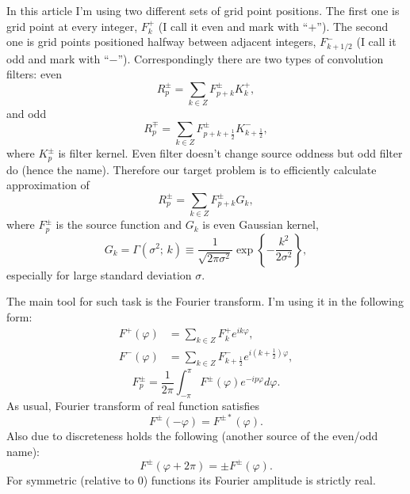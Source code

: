 \documentclass[10pt]{article}
\begin{document}
In this article I'm using two different sets of grid point positions. The first one is grid point at
every integer, $F^+_k$ (I call it even and mark with ``$+$''). The second one is grid points positioned
halfway between adjacent integers, $F^-_{k+1/2}$ (I call it odd and mark with ``$-$'').
Correspondingly there are two types of convolution filters: even
\begin{equation}\label{conv+}
    R^\pm_p = \sum_{k\in Z} F^\pm_{p+k}K^+_k,
\end{equation}
and odd
\begin{equation}\label{conv-}
    R^\mp_p = \sum_{k\in Z} F^\pm_{p+k+\frac12}K^-_{k+\frac12},
\end{equation}
where $K^\pm_p$ is filter kernel. Even filter doesn't change source oddness but odd filter do (hence
the name). Therefore our target problem is to efficiently calculate approximation of
\begin{equation}
    R^\pm_p = \sum_{k\in Z} F^\pm_{p+k}G_k,
\end{equation}
where $F^\pm_p$ is the source function and $G_k$ is even Gaussian kernel,
\begin{equation}\label{gamma}
    G_k = \Gamma(\sigma^2;\, k) \equiv
        \frac1{\sqrt{2\pi\sigma^2}}\exp\left\{-\frac{k^2}{2\sigma^2}\right\},
\end{equation}
especially for large standard deviation $\sigma$.

The main tool for such task is the Fourier transform. I'm using it in the following form:
\begin{align}
    F^+(\varphi) &= \sum_{k\in Z} F^+_k e^{ik\varphi},\\
    F^-(\varphi) &= \sum_{k\in Z} F^-_{k+\frac12} e^{i(k+\frac12)\varphi},
\end{align}
\begin{equation}
    F^\pm_p = \frac1{2\pi}\int_{-\pi}^\pi F^\pm(\varphi)e^{-ip\varphi}d\varphi.
\end{equation}
As usual, Fourier transform of real function satisfies
\begin{equation}
    F^\pm(-\varphi) = F^{\pm*}(\varphi).
\end{equation}
Also due to discreteness holds the following (another source of the even/odd name):
\begin{equation}
    F^\pm(\varphi+2\pi) = \pm F^\pm(\varphi).
\end{equation}
For symmetric (relative to 0) functions its Fourier amplitude is strictly real.
\end{document}
